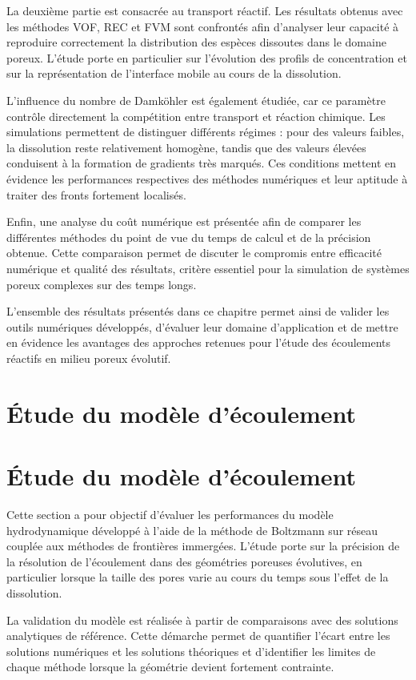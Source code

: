 \documentclass[12pt,a4paper]{report}
\begin{document}
La deuxième partie est consacrée au transport réactif. Les résultats obtenus avec les méthodes VOF, REC et FVM sont confrontés afin d’analyser leur capacité à reproduire correctement la distribution des espèces dissoutes dans le domaine poreux. L’étude porte en particulier sur l’évolution des profils de concentration et sur la représentation de l’interface mobile au cours de la dissolution.

L’influence du nombre de Damköhler est également étudiée, car ce paramètre contrôle directement la compétition entre transport et réaction chimique. Les simulations permettent de distinguer différents régimes : pour des valeurs faibles, la dissolution reste relativement homogène, tandis que des valeurs élevées conduisent à la formation de gradients très marqués. Ces conditions mettent en évidence les performances respectives des méthodes numériques et leur aptitude à traiter des fronts fortement localisés.

Enfin, une analyse du coût numérique est présentée afin de comparer les différentes méthodes du point de vue du temps de calcul et de la précision obtenue. Cette comparaison permet de discuter le compromis entre efficacité numérique et qualité des résultats, critère essentiel pour la simulation de systèmes poreux complexes sur des temps longs.

L’ensemble des résultats présentés dans ce chapitre permet ainsi de valider les outils numériques développés, d’évaluer leur domaine d’application et de mettre en évidence les avantages des approches retenues pour l’étude des écoulements réactifs en milieu poreux évolutif.
\section{Étude du modèle d’écoulement}
\section{Étude du modèle d’écoulement}

Cette section a pour objectif d’évaluer les performances du modèle hydrodynamique développé à l’aide de la méthode de Boltzmann sur réseau couplée aux méthodes de frontières immergées. L’étude porte sur la précision de la résolution de l’écoulement dans des géométries poreuses évolutives, en particulier lorsque la taille des pores varie au cours du temps sous l’effet de la dissolution.

La validation du modèle est réalisée à partir de comparaisons avec des solutions analytiques de référence. Cette démarche permet de quantifier l’écart entre les solutions numériques et les solutions théoriques et d’identifier les limites de chaque méthode lorsque la géométrie devient fortement contrainte.
\end{document}

